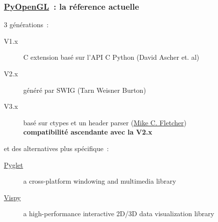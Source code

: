 \begin{frame}[fragile]
  \frametitle{\href{http://pyopengl.sourceforge.net}{PyOpenGL}~: la réference actuelle}
  3 générations~:
  \begin{description}
    \item[V1.x] C extension basé sur l'API C Python {\tiny (David Ascher et. al)}
    \item[V2.x] généré par SWIG {\tiny (Tarn Weisner Burton)}
    \item[V3.x] basé sur ctypes et un header parser %
      {\tiny (\href{http://www.vrplumber.com}{Mike C. Fletcher})} \\
      \textbf{compatibilité ascendante avec la V2.x}
    \end{description}
    \vspace{1em}
    et des alternatives plus spécifique~:
    \begin{description}
    \item[\href{http://www.pyglet.org}{Pyglet}] a cross-platform windowing and multimedia library
    \item[\href{http://vispy.org}{Vispy}] a high-performance interactive 2D/3D data visualization library
    \end{description}
\end{frame}

